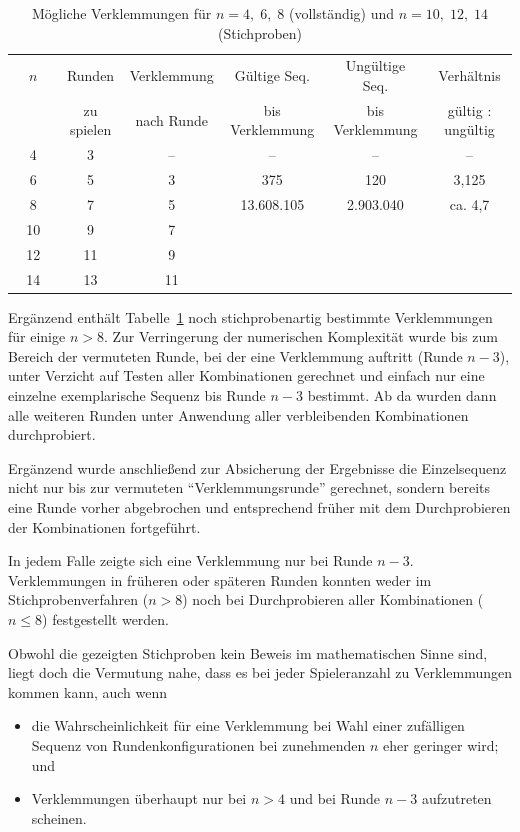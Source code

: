 \documentclass[DIV=15, 10pt]{scrartcl}
\begin{document}
\begin{table}[htbp]
\begin{center}
\begin{tabular}{cccccc}
\toprule
$\quad n \quad$ & Runden & Verklemmung & Gültige Seq. & Ungültige Seq. & Verhältnis\\
& zu spielen & nach Runde & bis Verklemmung & bis Verklemmung & gültig : ungültig\\[1mm]
\midrule
4 &  3 &  -- & -- & -- & -- \\[1mm]
6 &  5 &  3 & 375 & 120 & 3,125 \\[1mm]
8 &  7 &  5 & 13.608.105 & 2.903.040 & ca. 4,7 \\[1mm]
\midrule
10 & 9 & 7\\[1mm]
12 & 11 & 9\\[1mm]
14 & 13 & 11\\[1mm]
\bottomrule
\end{tabular}
\caption{Mögliche Verklemmungen für $n=4, \; 6, \; 8$ (vollständig) und $n=10, \; 12, \; 14$ (Stichproben)}
\label{tabDeadlock}
\end{center}
\end{table}

Ergänzend enthält Tabelle~\ref{tabDeadlock} noch stichprobenartig bestimmte Verklemmungen für einige $n > 8$. Zur Verringerung der numerischen Komplexität wurde bis zum Bereich der vermuteten Runde, bei der eine Verklemmung auftritt (Runde $n-3$), unter Verzicht auf Testen aller Kombinationen gerechnet und einfach nur eine einzelne exemplarische Sequenz bis Runde $n-3$ bestimmt. Ab da wurden dann alle weiteren Runden unter Anwendung aller verbleibenden Kombinationen durchprobiert.

Ergänzend wurde anschließend zur Absicherung der Ergebnisse die Einzelsequenz nicht nur bis zur vermuteten "`Verklemmungsrunde"' gerechnet, sondern bereits eine Runde vorher abgebrochen und entsprechend früher mit dem Durchprobieren der Kombinationen fortgeführt.

In jedem Falle zeigte sich eine Verklemmung nur bei Runde $n-3$. Verklemmungen in früheren oder späteren Runden konnten weder im Stichprobenverfahren ($n > 8$) noch bei Durchprobieren aller Kombinationen ($n \leq 8$) festgestellt werden.

Obwohl die gezeigten Stichproben kein Beweis im mathematischen Sinne sind, liegt doch die Vermutung nahe, dass es bei jeder Spieleranzahl zu Verklemmungen kommen kann, auch wenn

\begin{itemize}

\item die Wahrscheinlichkeit für eine Verklemmung bei Wahl einer zufälligen Sequenz von Rundenkonfigurationen bei zunehmenden $n$ eher geringer wird; und

\item Verklemmungen überhaupt nur bei $n > 4$ und bei Runde $n - 3$ aufzutreten scheinen.

\end{itemize}
\end{document}
